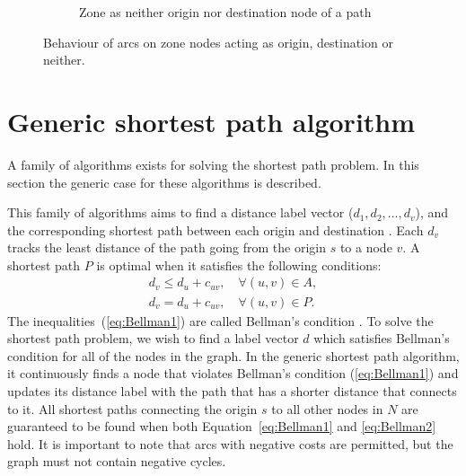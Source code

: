 \begin{figure}[!ht]
    \vspace{1cm}
    \begin{subfigure}[t]{\textwidth}
        \centering
        \caption{Zone as neither origin nor destination node of a path}
    \end{subfigure}
    \caption{Behaviour of arcs on zone nodes acting as origin, destination or neither.}
    \label{fig:zonenodes}
\end{figure}

\section{Generic shortest path algorithm}
A family of algorithms exists for solving the shortest path problem.
In this section the generic case for these algorithms is described.

This family of algorithms aims to find a 
distance label vector ($d_1, d_2,\dots, d_v$),
and the corresponding shortest path between each origin and destination \citep{Klunder}.
Each $d_v$ tracks the least distance of the path going from the origin $s$ to a node $v$.
A shortest path $P$ is optimal when it satisfies the following conditions:
\begin{align}
    d_v \leq d_u + c_{uv}, \quad \forall(u,v) \in A, \label{eq:Bellman1}\\
    d_v  =   d_u + c_{uv}, \quad \forall(u,v) \in P. \label{eq:Bellman2}
\end{align}
The inequalities~(\ref{eq:Bellman1}) are called Bellman's condition \citep{Bellman}.
To solve the shortest path problem,
we wish to find a label vector $d$ which satisfies Bellman's condition for all of the nodes in the graph.
In the generic shortest path algorithm,
it continuously finds a node that violates Bellman's condition (\ref{eq:Bellman1}) and updates its distance label with the path that has a shorter distance that connects to it.
All shortest paths connecting the origin $s$ to all other nodes in $N$ are guaranteed to be found when both Equation~\eqref{eq:Bellman1} and \eqref{eq:Bellman2} hold.
It is important to note that arcs with negative costs are permitted,
but the graph must not contain negative cycles.

